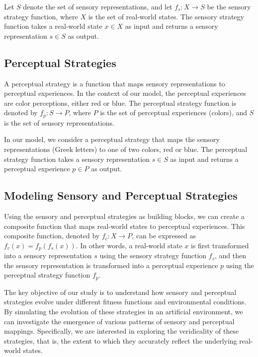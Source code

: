 \documentclass{article}[10pt]
\begin{document}
Let $S$ denote the set of sensory representations, and let $f_s: X \rightarrow S$ be the sensory strategy function, where $X$ is the set of real-world states. The sensory strategy function takes a real-world state $x \in X$ as input and returns a sensory representation $s \in S$ as output.

\subsection{Perceptual Strategies}

A perceptual strategy is a function that maps sensory representations to perceptual experiences. In the context of our model, the perceptual experiences are color perceptions, either red or blue. The perceptual strategy function is denoted by $f_p: S \rightarrow P$, where $P$ is the set of perceptual experiences (colors), and $S$ is the set of sensory representations.

In our model, we consider a perceptual strategy that maps the sensory representations (Greek letters) to one of two colors, red or blue. The perceptual strategy function takes a sensory representation $s \in S$ as input and returns a perceptual experience $p \in P$ as output.

\subsection{Modeling Sensory and Perceptual Strategies}

Using the sensory and perceptual strategies as building blocks, we can create a composite function that maps real-world states to perceptual experiences. This composite function, denoted by $f_c: X \rightarrow P$, can be expressed as $f_c(x) = f_p(f_s(x))$. In other words, a real-world state $x$ is first transformed into a sensory representation $s$ using the sensory strategy function $f_s$, and then the sensory representation is transformed into a perceptual experience $p$ using the perceptual strategy function $f_p$.

The key objective of our study is to understand how sensory and perceptual strategies evolve under different fitness functions and environmental conditions. By simulating the evolution of these strategies in an artificial environment, we can investigate the emergence of various patterns of sensory and perceptual mappings. Specifically, we are interested in exploring the veridicality of these strategies, that is, the extent to which they accurately reflect the underlying real-world states.
\end{document}
